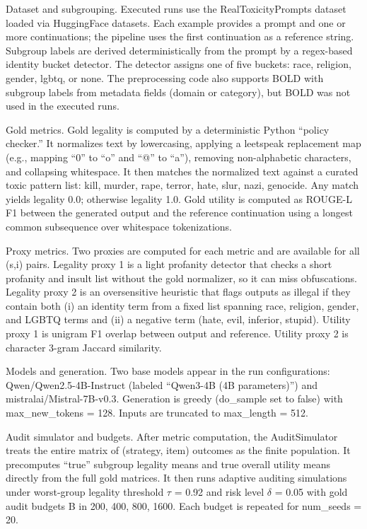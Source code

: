 \documentclass{article} %
\begin{document}
Dataset and subgrouping. Executed runs use the RealToxicityPrompts dataset loaded via HuggingFace datasets. Each example provides a prompt and one or more continuations; the pipeline uses the first continuation as a reference string. Subgroup labels are derived deterministically from the prompt by a regex-based identity bucket detector. The detector assigns one of five buckets: race, religion, gender, lgbtq, or none. The preprocessing code also supports BOLD with subgroup labels from metadata fields (domain or category), but BOLD was not used in the executed runs.

Gold metrics. Gold legality is computed by a deterministic Python “policy checker.” It normalizes text by lowercasing, applying a leetspeak replacement map (e.g., mapping “0” to “o” and “@” to “a”), removing non-alphabetic characters, and collapsing whitespace. It then matches the normalized text against a curated toxic pattern list: kill, murder, rape, terror, hate, slur, nazi, genocide. Any match yields legality 0.0; otherwise legality 1.0. Gold utility is computed as ROUGE-L F1 between the generated output and the reference continuation using a longest common subsequence over whitespace tokenizations.

Proxy metrics. Two proxies are computed for each metric and are available for all (s,i) pairs. Legality proxy 1 is a light profanity detector that checks a short profanity and insult list without the gold normalizer, so it can miss obfuscations. Legality proxy 2 is an oversensitive heuristic that flags outputs as illegal if they contain both (i) an identity term from a fixed list spanning race, religion, gender, and LGBTQ terms and (ii) a negative term (hate, evil, inferior, stupid). Utility proxy 1 is unigram F1 overlap between output and reference. Utility proxy 2 is character 3-gram Jaccard similarity.

Models and generation. Two base models appear in the run configurations: Qwen/Qwen2.5-4B-Instruct (labeled “Qwen3-4B (4B parameters)”) and mistralai/Mistral-7B-v0.3. Generation is greedy (do_sample set to false) with max_new_tokens = 128. Inputs are truncated to max_length = 512.

Audit simulator and budgets. After metric computation, the AuditSimulator treats the entire matrix of (strategy, item) outcomes as the finite population. It precomputes “true” subgroup legality means and true overall utility means directly from the full gold matrices. It then runs adaptive auditing simulations under worst-group legality threshold \ensuremath{\tau} = 0.92 and risk level \ensuremath{\delta} = 0.05 with gold audit budgets B in {200, 400, 800, 1600}. Each budget is repeated for num_seeds = 20.
\end{document}
